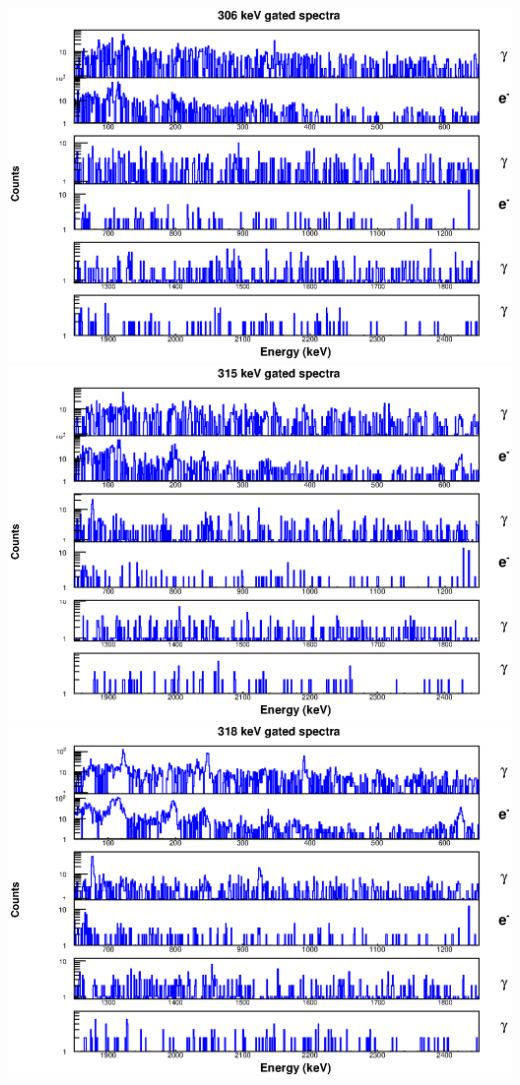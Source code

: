 \includegraphics[scale=0.8]{154Gd_Appendix/306_combined.eps}
\includegraphics[scale=0.8]{154Gd_Appendix/315_combined.eps}
\includegraphics[scale=0.8]{154Gd_Appendix/318_combined.eps}

